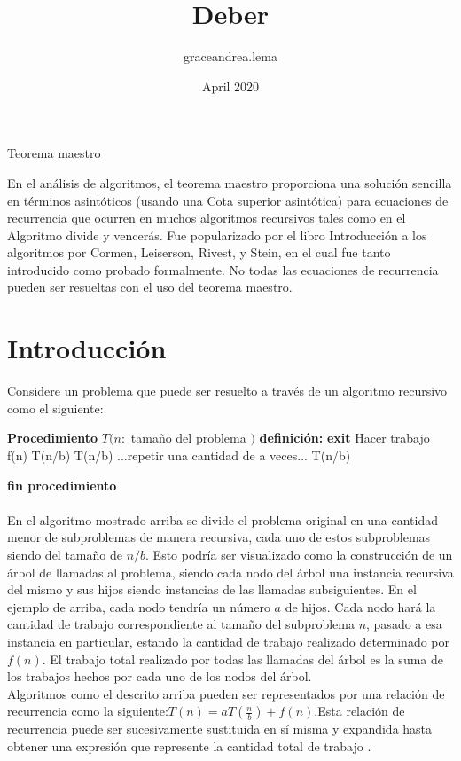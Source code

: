 \documentclass[12pt]{article}
\title{Deber}
\author{graceandrea.lema }
\date{April 2020}
\begin{document}
\wikimarkup

{\Huge Teorema maestro } 

En el análisis de algoritmos, el teorema maestro proporciona una solución sencilla en términos asintóticos (usando una Cota superior asintótica) para ecuaciones de recurrencia que ocurren en muchos algoritmos recursivos tales como en el Algoritmo divide y vencerás. Fue popularizado por el libro Introducción a los algoritmos por Cormen, Leiserson, Rivest, y Stein, en el cual fue tanto introducido como probado formalmente. No todas las ecuaciones de recurrencia pueden ser resueltas con el uso del teorema maestro.

\section{Introducción}
Considere un problema que puede ser resuelto a través de un algoritmo recursivo como el siguiente: 
\begin{algorithmic}
\State \textbf{Procedimiento} $ T(n:$ tamaño del problema $)$
\State \textbf{definición:}
 \textbf{exit}
\State Hacer trabajo f(n)
\State   T(n/b)
\State   T(n/b)
\State   ...repetir una cantidad de  a veces...
\State   T(n/b)
\EndIf
\end{algorithmic}
\textbf{fin procedimiento}\\\\
En el algoritmo mostrado arriba se divide el problema original en una cantidad menor de subproblemas de manera recursiva, cada uno de estos subproblemas siendo del tamaño de $n/b$. Esto podría ser visualizado como la construcción de un árbol de llamadas al problema, siendo cada nodo del árbol una instancia recursiva del mismo y sus hijos siendo instancias de las llamadas subsiguientes. En el ejemplo de arriba, cada nodo tendría un número $a$ de hijos. Cada nodo hará la cantidad de trabajo correspondiente al tamaño del subproblema $n$, pasado a esa instancia en particular, estando la cantidad de trabajo realizado determinado por $f(n)$. El trabajo total realizado por todas las llamadas del árbol es la suma de los trabajos hechos por cada uno de los nodos del árbol.\\
Algoritmos como el descrito arriba pueden ser representados por una relación de recurrencia como la siguiente:$T(n)=aT(\frac{n}{b})+f(n)$.Esta relación de recurrencia puede ser sucesivamente sustituida en sí misma y expandida hasta obtener una expresión que represente la cantidad total de trabajo
\cite{wiki:big}.
\end{document}
